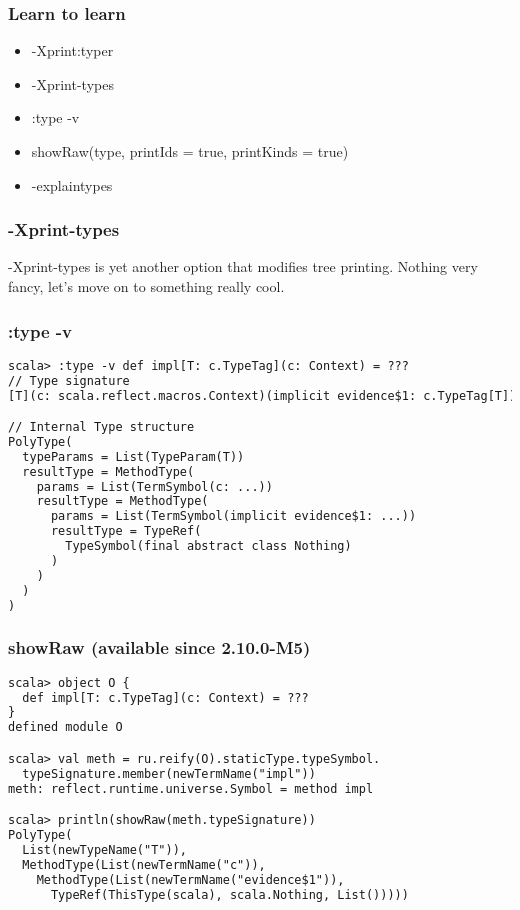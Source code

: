 \documentclass[hyperref={bookmarks=false}]{beamer}
\begin{document}
\begin{frame}[fragile]
\frametitle{Learn to learn}

\begin{itemize}
\item -Xprint:typer
\item -Xprint-types
\item :type -v
\item showRaw(type, printIds = true, printKinds = true)
\item -explaintypes
\end{itemize}

\end{frame}

\begin{frame}[fragile]
\frametitle{-Xprint-types}

-Xprint-types is yet another option that modifies tree printing.
Nothing very fancy, let's move on to something really cool.

\end{frame}

\begin{frame}[fragile]
\frametitle{:type -v}

\begin{lstlisting}[language=XML]
scala> :type -v def impl[T: c.TypeTag](c: Context) = ???
// Type signature
[T](c: scala.reflect.macros.Context)(implicit evidence$1: c.TypeTag[T])Nothing

// Internal Type structure
PolyType(
  typeParams = List(TypeParam(T))
  resultType = MethodType(
    params = List(TermSymbol(c: ...))
    resultType = MethodType(
      params = List(TermSymbol(implicit evidence$1: ...))
      resultType = TypeRef(
        TypeSymbol(final abstract class Nothing)
      )
    )
  )
)
\end{lstlisting}
\end{frame}

\begin{frame}[fragile]
\frametitle{showRaw (available since 2.10.0-M5)}

\begin{lstlisting}[language=XML]
scala> object O {
  def impl[T: c.TypeTag](c: Context) = ???
}
defined module O

scala> val meth = ru.reify(O).staticType.typeSymbol.
  typeSignature.member(newTermName("impl"))
meth: reflect.runtime.universe.Symbol = method impl

scala> println(showRaw(meth.typeSignature))
PolyType(
  List(newTypeName("T")),
  MethodType(List(newTermName("c")),
    MethodType(List(newTermName("evidence$1")),
      TypeRef(ThisType(scala), scala.Nothing, List()))))
\end{lstlisting}
\end{frame}
\end{document}
